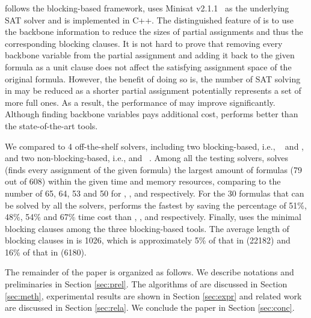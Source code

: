 \tool follows the blocking-based framework, uses Minisat v2.1.1~\cite{minisat} as the underlying SAT solver and is implemented in C++. The distinguished feature of \tool is to use the backbone information to reduce the sizes of partial assignments and thus the corresponding blocking clauses. It is not hard to prove that removing every backbone variable from the partial assignment and adding it back to the given formula as a unit clause does not affect the satisfying assignment space of the original formula. 
However, the benefit of doing so is, the number of SAT solving in \tool may be reduced as a shorter partial assignment potentially represents a set of more full ones. As a result, the performance of \tool may improve significantly. Although finding backbone variables pays additional cost, \tool performs better than the state-of-the-art tools.

We compared \tool to 4 off-the-shelf solvers, including two blocking-based, i.e., \ctool~\cite{ctool} and \bc, and two non-blocking-based, i.e., \nbc and \bdd~\cite{ietool}. Among all the testing solvers, \tool solves (finds every assignment of the given formula) the largest amount of formulas (79 out of 608) within the given time and memory resources, comparing to the number of 65, 64, 53 and 50 for \ctool, \bc, \nbc and \bdd  respectively. 
For the 30 formulas that can be solved by all the solvers, \tool performs the fastest by saving the percentage of 51\%, 48\%, 54\% and 67\% time cost than \ctool, \bc, \nbc and \bdd respectively.
Finally, \tool uses the minimal blocking clauses among the three blocking-based tools. The average length of blocking clauses in \tool is 1026, which is approximately 5\% of that in \ctool (22182) and 16\% of that in \bc (6180). 

The remainder of the paper is organized as follows. We describe notations and preliminaries in Section \ref{sec:prel}. The algorithms of \tool are discussed in Section \ref{sec:meth}, experimental results are shown in Section \ref{sec:expr} and related work are discussed in Section \ref{sec:rela}. We conclude the paper in Section \ref{sec:conc}.

